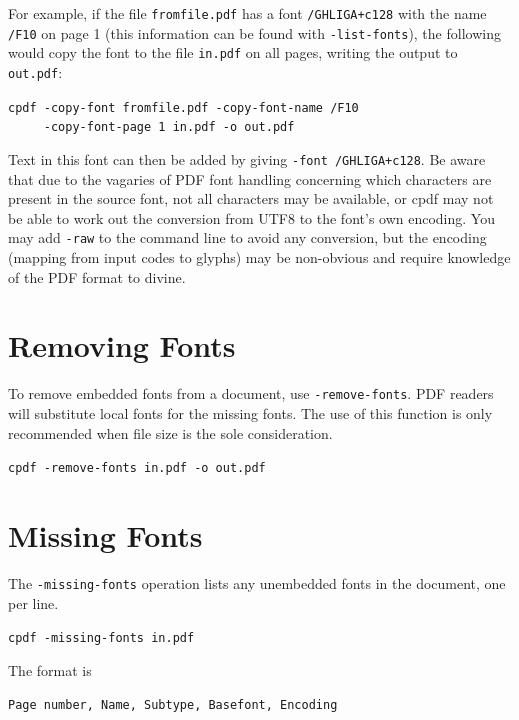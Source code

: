 \documentclass{book}
\begin{document}
For example, if the file \verb!fromfile.pdf! has a font \verb!/GHLIGA+c128! with
the name \verb!/F10! on page 1 (this information can be found with
\verb!-list-fonts!), the following would copy the font to the file
\verb!in.pdf! on all pages, writing the output to \verb!out.pdf!:
  \begin{framed}
  \small\noindent\verb!cpdf -copy-font fromfile.pdf -copy-font-name /F10!\\
  \small\noindent\verb!     -copy-font-page 1 in.pdf -o out.pdf!
  \end{framed}

\noindent Text in this font can then be added by giving \verb!-font /GHLIGA+c128!. Be
aware that due to the vagaries of PDF font handling concerning which characters
are present in the source font, not all characters may be available, or cpdf may not be able to work out the conversion from UTF8 to the font's own encoding. You may add \texttt{-raw} to the command line to avoid any conversion, but the encoding (mapping from input codes to glyphs) may be non-obvious and require knowledge of the PDF format to divine.

\section{Removing Fonts}
\label{removefont}

To remove embedded fonts from a document, use \verb!-remove-fonts!. PDF readers will
substitute local fonts for the missing fonts. The use of this function is only
recommended when file size is the sole consideration.

  \begin{framed}
  \small\noindent\verb!cpdf -remove-fonts in.pdf -o out.pdf!
  \vspace{2.5mm}
  \end{framed}

\section{Missing Fonts}\label{listmisingfonts}
  The \verb!-missing-fonts! operation lists any unembedded fonts in the document, one per line.
  \begin{framed}
  \small\noindent\verb!cpdf -missing-fonts in.pdf!
  \end{framed}

  \noindent The format is
  \begin{framed}
  \small\noindent\verb!Page number, Name, Subtype, Basefont, Encoding!
  \end{framed}
\end{document}
